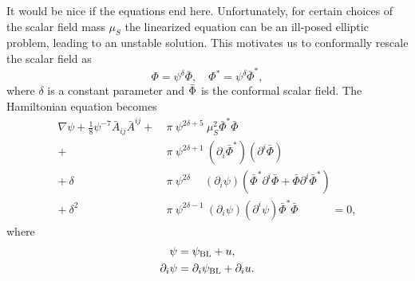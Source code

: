 It would be nice if the equations end here.
Unfortunately, for certain choices of the scalar field mass $\mu_S$ the linearized equation can be an ill-posed elliptic problem,
leading to an unstable solution.
This motivates us to conformally rescale the scalar field as
\begin{equation}
    \Phi = \psi^\delta \bar{\Phi},
    \quad
    \Phi^* = \psi^\delta \bar{\Phi}^*,
\end{equation}
where $\delta$ is a constant parameter
and $\Bar{\Phi}$ is the conformal scalar field.
The Hamiltonian equation becomes
\begin{align}
    \nabla\psi
    + \frac{1}{8} \psi^{-7} \bar{A}_{ij} \bar{A}^{ij}
    +\
    &\pi\ \psi^{2\delta + 5}\
    \mu_S^2 \bar{\Phi}^* \bar{\Phi}
    \nonumber
    \\
    +\
    &\pi\ \psi^{2\delta + 1}\
    (\partial_i\bar{\Phi}^*)
    (\partial^i\bar{\Phi})
    \nonumber
    \\
    +\ \delta
    &\pi\ \psi^{2\delta}\quad\
    (\partial_i\psi)
    ( \bar{\Phi}^* \partial^i\bar{\Phi}
    + \bar{\Phi} \partial^i\bar{\Phi}^* )
    \nonumber
    \\
    +\ \delta^2
    &\pi\ \psi^{2\delta-1}\ (\partial_i\psi) (\partial^i\psi)
    \bar{\Phi}^* \bar{\Phi}
    \quad\quad\quad
    = 0,
\end{align}
where 
\begin{align}
    \psi 
    &= \psi_{\rm BL} + u,
    \\
    \partial_i\psi 
    &= \partial_i\psi_{\rm BL} + \partial_i u.
\end{align}

